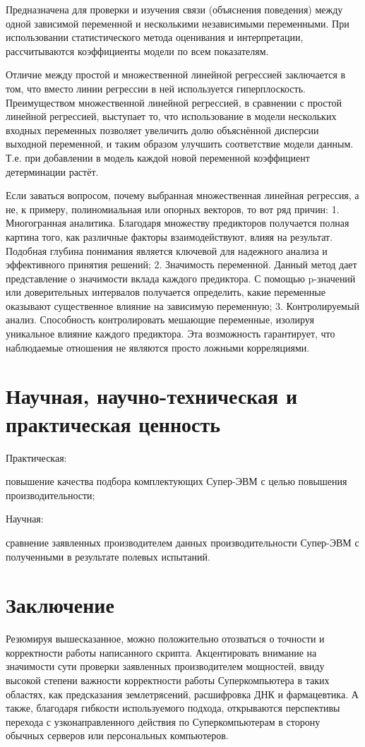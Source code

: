 \documentclass{article}
\begin{document}
Предназначена для проверки и изучения связи (объяснения поведения) между одной зависимой переменной и несколькими независимыми переменными. При использовании статистического метода оценивания и интерпретации, рассчитываются коэффициенты модели по всем показателям.

Отличие между простой и множественной линейной регрессией заключается в том, что вместо линии регрессии в ней используется гиперплоскость.
Преимуществом множественной линейной регрессией, в сравнении с простой линейной регрессией, выступает то, что использование в модели нескольких входных переменных позволяет увеличить долю объяснённой дисперсии выходной переменной, и таким образом улучшить соответствие модели данным. Т.е. при добавлении в модель каждой новой переменной коэффициент детерминации растёт.

Если заваться вопросом, почему выбранная множественная линейная регрессия, а не, к примеру, полиномиальная или опорных векторов, то вот ряд причин:
1. Многогранная аналитика. Благодаря множеству предикторов получается полная картина того, как различные факторы взаимодействуют, влияя на результат. Подобная глубина понимания является ключевой для надежного анализа и эффективного принятия решений;
2. Значимость переменной. Данный метод дает представление о значимости вклада каждого предиктора. С помощью p-значений или доверительных интервалов получается определить, какие переменные оказывают существенное влияние на зависимую переменную;
3. Контролируемый анализ. Способность контролировать мешающие переменные, изолируя уникальное влияние каждого предиктора. Эта возможность гарантирует, что наблюдаемые отношения не являются просто ложными корреляциями.

\section{Научная, научно-техническая и практическая ценность}
Практическая:

повышение качества подбора комплектующих Супер-ЭВМ с целью повышения производительности;

Научная:

сравнение заявленных производителем данных производительности Супер-ЭВМ с полученными в результате полевых испытаний.

\section{Заключение}
Резюмируя вышесказанное, можно положительно отозваться о точности и корректности работы написанного скрипта. Акцентировать внимание на значимости сути проверки заявленных производителем мощностей, ввиду высокой степени важности корректности работы Суперкомпьютера в таких областях, как предсказания землетрясений, расшифровка ДНК и фармацевтика. А также, благодаря гибкости используемого подхода, открываются перспективы перехода с узконаправленного действия по Суперкомпьютерам в сторону обычных серверов или персональных компьютеров.
\end{document}
